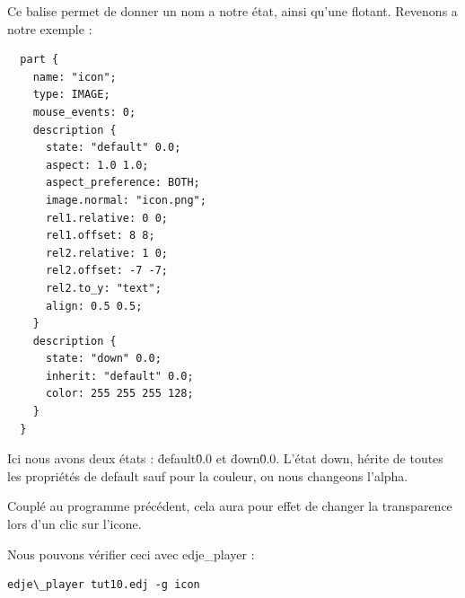 \documentclass[a4paper]{efr}
\begin{document}
Ce balise permet de donner un nom a notre état, ainsi qu'une flotant.
Revenons a notre exemple :

\begin{lstlisting}
  part {
    name: "icon";
    type: IMAGE;
    mouse_events: 0;
    description {
      state: "default" 0.0;
      aspect: 1.0 1.0;
      aspect_preference: BOTH;
      image.normal: "icon.png";
      rel1.relative: 0 0;
      rel1.offset: 8 8;
      rel2.relative: 1 0;
      rel2.offset: -7 -7;
      rel2.to_y: "text";
      align: 0.5 0.5;
    }
    description {
      state: "down" 0.0;
      inherit: "default" 0.0;
      color: 255 255 255 128;
    }
  }
\end{lstlisting}

Ici nous avons deux états : \"default\" 0.0 et \"down\" 0.0.
L'état down, hérite de toutes les propriétés de default sauf pour la couleur, ou
nous changeons l'alpha.

Couplé au programme précédent, cela aura pour effet de changer la transparence
lors d'un clic sur l'icone.

Nous pouvons vérifier ceci avec edje\_player :
\begin{lstlisting}
edje\_player tut10.edj -g icon
\end{lstlisting}
\end{document}
